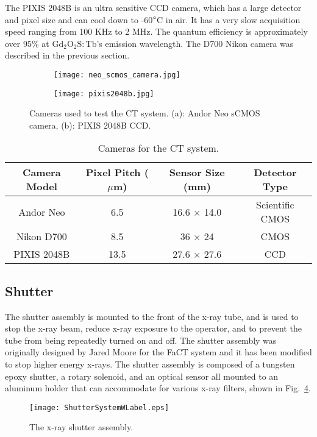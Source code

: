 The PIXIS 2048B is an ultra sensitive CCD camera, which has a large detector and pixel size and can cool down to -60$\degree$C in air.  It has a very slow acquisition speed ranging from 100 KHz to 2 MHz.  The quantum efficiency is approximately over 95\% at $\mathrm{Gd_2O_2S:Tb}$'s emission wavelength. The D700 Nikon camera was described in the previous section.
%
\begin{figure}
	\begin{subfigure}[b]{0.45\linewidth}
	\centering
	\texttt{[image: neo\_scmos\_camera.jpg]}
	\caption{}
	\label{fig:neo}
	\end{subfigure}
\hspace{1 cm}	
	\begin{subfigure}[b]{0.45\linewidth}
	\centering
	\texttt{[image: pixis2048b.jpg]}
	\caption{}
	\label{fig:pixis}
	\end{subfigure}
\caption{Cameras used to test the CT system. (a): Andor Neo sCMOS camera, (b): PIXIS 2048B CCD.}
\label{fig:cameras}
\end{figure}

\begin{table}[h]
\begin{tabular}{c|c|c|c}
\hline
Camera Model & Pixel Pitch ($\mu$m) & Sensor Size (mm) & Detector Type \\ \hline
Andor Neo & 6.5 & 16.6 $\times$ 14.0 & Scientific CMOS \\ \hline
Nikon D700 & 8.5 & 36 $\times$ 24 & CMOS \\ \hline
PIXIS 2048B & 13.5 & 27.6 $\times$ 27.6 & CCD \\
\hline
\end{tabular}
\caption{Cameras for the CT system.}
\label{table:cameras}
\end{table}

\subsection{Shutter}
The shutter assembly is mounted to the front of the x-ray tube, and is used to stop the x-ray beam, reduce x-ray exposure to the operator, and to prevent the tube from being repeatedly turned on and off.  The shutter assembly was originally designed by Jared Moore for the FaCT system and it has been modified to stop higher energy x-rays.  The shutter assembly is composed of a tungsten epoxy shutter, a rotary solenoid, and an optical sensor all mounted to an aluminum holder that can accommodate for various x-ray filters, shown in Fig.~\ref{fig:shutter}.
%
\begin{figure}[h]
\centering
	\texttt{[image: ShutterSystemWLabel.eps]}
	\caption{The x-ray shutter assembly.}
	\label{fig:shutter}
\end{figure}

